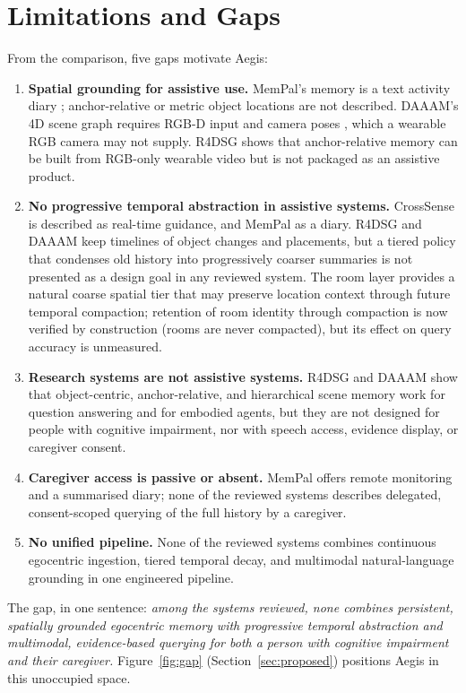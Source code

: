 \section{Limitations and Gaps}
From the comparison, five gaps motivate Aegis:
\begin{enumerate}
\item \textbf{Spatial grounding for assistive use.} MemPal's memory is a text
activity diary \cite{mempal2025}; anchor-relative or metric object locations
are not described. DAAAM's 4D scene graph requires RGB-D input and camera poses
\cite{daaam2026}, which a wearable RGB camera may not supply. R4DSG shows that
anchor-relative memory can be built from RGB-only wearable video
\cite{r4dsg2026} but is not packaged as an assistive product.
\item \textbf{No progressive temporal abstraction in assistive systems.}
CrossSense is described as real-time guidance, and MemPal as a diary. R4DSG and
DAAAM keep timelines of object changes and placements, but a tiered policy that
condenses old history into progressively coarser summaries is not presented as
a design goal in any reviewed system. The room layer provides a natural coarse
spatial tier that may preserve location context through future temporal
compaction; retention of room identity through compaction is now verified by
construction (rooms are never compacted), but its effect on query accuracy is
unmeasured.
\item \textbf{Research systems are not assistive systems.} R4DSG and DAAAM show
that object-centric, anchor-relative, and hierarchical scene memory work for
question answering and for embodied agents, but they are not designed for
people with cognitive impairment, nor with speech access, evidence display, or
caregiver consent.
\item \textbf{Caregiver access is passive or absent.} MemPal offers remote
monitoring and a summarised diary; none of the reviewed systems describes
delegated, consent-scoped querying of the full history by a caregiver.
\item \textbf{No unified pipeline.} None of the reviewed systems combines
continuous egocentric ingestion, tiered temporal decay, and multimodal
natural-language grounding in one engineered pipeline.
\end{enumerate}
The gap, in one sentence: \emph{among the systems reviewed, none combines
persistent, spatially grounded egocentric memory with progressive temporal
abstraction and multimodal, evidence-based querying for both a person with
cognitive impairment and their caregiver.} Figure~\ref{fig:gap}
(Section~\ref{sec:proposed}) positions Aegis in this unoccupied space.

